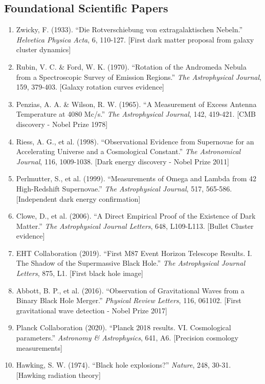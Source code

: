 \documentclass[11pt,a4paper]{article}
\begin{document}
\subsection{Foundational Scientific Papers}
\small
\begin{enumerate}[noitemsep]
    \item Zwicky, F. (1933). ``Die Rotverschiebung von extragalaktischen Nebeln.'' \textit{Helvetica Physica Acta}, 6, 110-127. [First dark matter proposal from galaxy cluster dynamics]
    \item Rubin, V. C. \& Ford, W. K. (1970). ``Rotation of the Andromeda Nebula from a Spectroscopic Survey of Emission Regions.'' \textit{The Astrophysical Journal}, 159, 379-403. [Galaxy rotation curves evidence]
    \item Penzias, A. A. \& Wilson, R. W. (1965). ``A Measurement of Excess Antenna Temperature at 4080 Mc/s.'' \textit{The Astrophysical Journal}, 142, 419-421. [CMB discovery - Nobel Prize 1978]
    \item Riess, A. G., et al. (1998). ``Observational Evidence from Supernovae for an Accelerating Universe and a Cosmological Constant.'' \textit{The Astronomical Journal}, 116, 1009-1038. [Dark energy discovery - Nobel Prize 2011]
    \item Perlmutter, S., et al. (1999). ``Measurements of Omega and Lambda from 42 High-Redshift Supernovae.'' \textit{The Astrophysical Journal}, 517, 565-586. [Independent dark energy confirmation]
    \item Clowe, D., et al. (2006). ``A Direct Empirical Proof of the Existence of Dark Matter.'' \textit{The Astrophysical Journal Letters}, 648, L109-L113. [Bullet Cluster evidence]
    \item EHT Collaboration (2019). ``First M87 Event Horizon Telescope Results. I. The Shadow of the Supermassive Black Hole.'' \textit{The Astrophysical Journal Letters}, 875, L1. [First black hole image]
    \item Abbott, B. P., et al. (2016). ``Observation of Gravitational Waves from a Binary Black Hole Merger.'' \textit{Physical Review Letters}, 116, 061102. [First gravitational wave detection - Nobel Prize 2017]
    \item Planck Collaboration (2020). ``Planck 2018 results. VI. Cosmological parameters.'' \textit{Astronomy \& Astrophysics}, 641, A6. [Precision cosmology measurements]
    \item Hawking, S. W. (1974). ``Black hole explosions?'' \textit{Nature}, 248, 30-31. [Hawking radiation theory]

\end{enumerate}
\end{document}
